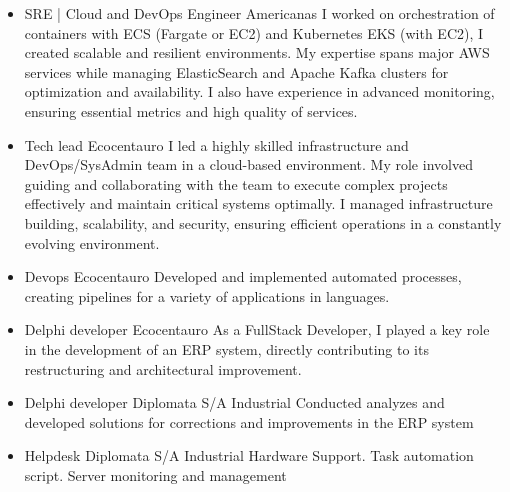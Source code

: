 \documentclass[11pt,a4paper]{moderncv}              %
\begin{document}
\vspace{6pt}
\begin{itemize}

\item
{
{}
{SRE | Cloud and DevOps Engineer}
{Americanas}
{}
{
I worked on orchestration of containers with ECS (Fargate or EC2) and Kubernetes EKS (with EC2), I created scalable and resilient environments.
My expertise spans major AWS services while managing ElasticSearch and Apache Kafka clusters for optimization and availability.    
I also have experience in advanced monitoring, ensuring essential metrics and high quality of services.}
}

\vspace{6pt}
\item
{
{}
{Tech lead}
{Ecocentauro}
{}
{
I led a highly skilled infrastructure and DevOps/SysAdmin team in a cloud-based environment. 
My role involved guiding and collaborating with the team to execute complex projects effectively and maintain critical systems optimally. 
I managed infrastructure building, scalability, and security, ensuring efficient operations in a constantly evolving environment.}
}

\vspace{6pt}
\item
{
{}
{Devops}
{Ecocentauro}
{}
{Developed and implemented automated processes, creating pipelines for a variety of applications in languages.}
}

\newpage

\vspace{6pt}
\item
{
{}
{Delphi developer}
{Ecocentauro}
{}
{As a FullStack Developer, I played a key role in the development of an ERP system, directly contributing to its restructuring and architectural improvement.}
}

\vspace{6pt}
\item
{
{}
{Delphi developer}
{Diplomata S/A Industrial}
{}
{Conducted analyzes and developed solutions for corrections and improvements in the ERP system}
}

\vspace{6pt}
\item
{
{}
{Helpdesk}
{Diplomata S/A Industrial}
{}
{Hardware Support. Task automation script. Server monitoring and management}
}

\end{itemize}
\end{document}

